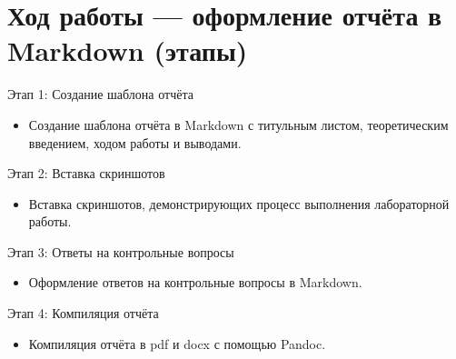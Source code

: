 \documentclass[
  ignorenonframetext,
  aspectratio=169,
  russian,
  aspectratio=169]{beamer}
\providecommand{\tightlist}{%
  \setlength{\itemsep}{0pt}\setlength{\parskip}{0pt}}
\begin{document}
\section{Ход работы --- оформление отчёта в Markdown
(этапы)}\label{ux445ux43eux434-ux440ux430ux431ux43eux442ux44b-ux43eux444ux43eux440ux43cux43bux435ux43dux438ux435-ux43eux442ux447ux451ux442ux430-ux432-markdown-ux44dux442ux430ux43fux44b}

\begin{frame}{Этап 1: Создание шаблона отчёта}
\label{ux44dux442ux430ux43f-1-ux441ux43eux437ux434ux430ux43dux438ux435-ux448ux430ux431ux43bux43eux43dux430-ux43eux442ux447ux451ux442ux430}
\begin{itemize}[<+->]
\tightlist
\item
  Создание шаблона отчёта в Markdown с титульным листом, теоретическим
  введением, ходом работы и выводами.
\end{itemize}
\end{frame}

\begin{frame}{Этап 2: Вставка скриншотов}
\label{ux44dux442ux430ux43f-2-ux432ux441ux442ux430ux432ux43aux430-ux441ux43aux440ux438ux43dux448ux43eux442ux43eux432}
\begin{itemize}[<+->]
\tightlist
\item
  Вставка скриншотов, демонстрирующих процесс выполнения лабораторной
  работы.
\end{itemize}
\end{frame}

\begin{frame}{Этап 3: Ответы на контрольные вопросы}
\label{ux44dux442ux430ux43f-3-ux43eux442ux432ux435ux442ux44b-ux43dux430-ux43aux43eux43dux442ux440ux43eux43bux44cux43dux44bux435-ux432ux43eux43fux440ux43eux441ux44b}
\begin{itemize}[<+->]
\tightlist
\item
  Оформление ответов на контрольные вопросы в Markdown.
\end{itemize}
\end{frame}

\begin{frame}{Этап 4: Компиляция отчёта}
\label{ux44dux442ux430ux43f-4-ux43aux43eux43cux43fux438ux43bux44fux446ux438ux44f-ux43eux442ux447ux451ux442ux430}
\begin{itemize}[<+->]
\tightlist
\item
  Компиляция отчёта в pdf и docx с помощью Pandoc.
\end{itemize}
\end{frame}
\end{document}
